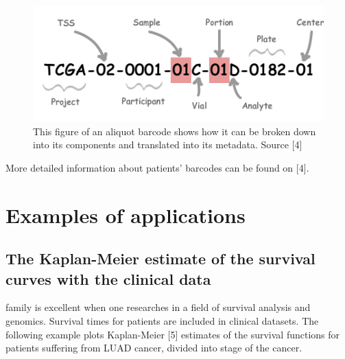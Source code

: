 \begin{figure}[h!]
\includegraphics[width=14cm]{barcode.png}
\caption{\label{barcode}This figure of an aliquot barcode shows how it can be broken down into its components and translated into its metadata. Source [4]}
\end{figure}

More detailed information about patients' barcodes can be found on
{[}4{]}.

\section{Examples of applications}\label{examples-of-applications}

\subsection{The Kaplan-Meier estimate of the survival curves with the
clinical
data}\label{the-kaplan-meier-estimate-of-the-survival-curves-with-the-clinical-data}

 family is excellent when one researches in a field of
survival analysis and genomics. Survival times for patients are included
in clinical datasets. The following example plots Kaplan-Meier {[}5{]}
estimates of the survival functions for patients suffering from LUAD
cancer, divided into stage of the cancer.

